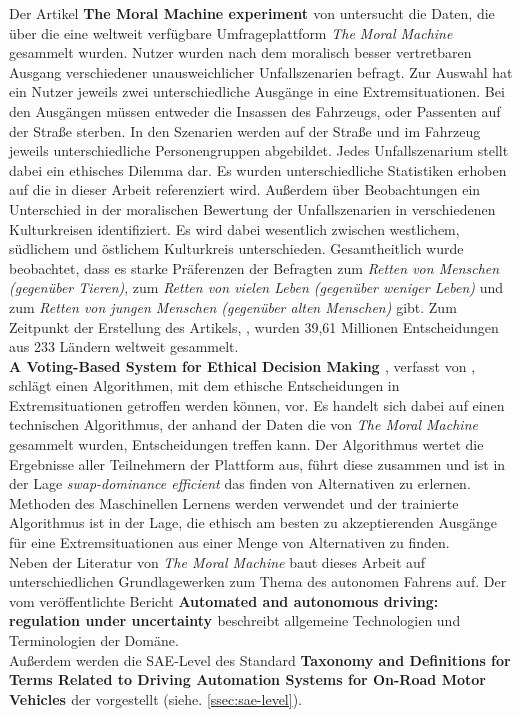 Der Artikel \textbf{The Moral Machine experiment \cite{moralMachine}} von \citeauthor{moralMachine} untersucht die Daten, die über die eine weltweit verfügbare Umfrageplattform \textit{The Moral Machine} gesammelt wurden. Nutzer wurden nach dem moralisch besser vertretbaren Ausgang verschiedener unausweichlicher Unfallszenarien befragt. Zur Auswahl hat ein Nutzer jeweils zwei unterschiedliche Ausgänge in eine Extremsituationen. Bei den Ausgängen müssen entweder die Insassen des Fahrzeugs, oder Passenten auf der Straße sterben. In den Szenarien werden auf der Straße und im Fahrzeug jeweils unterschiedliche Personengruppen abgebildet. Jedes Unfallszenarium stellt dabei ein ethisches Dilemma dar. Es wurden unterschiedliche Statistiken erhoben auf die in dieser Arbeit referenziert wird. Außerdem über Beobachtungen ein Unterschied in der moralischen Bewertung der Unfallszenarien in verschiedenen Kulturkreisen identifiziert. Es wird dabei wesentlich zwischen westlichem, südlichem und östlichem Kulturkreis unterschieden. Gesamtheitlich wurde beobachtet, dass es starke Präferenzen der Befragten zum \textit{Retten von Menschen (gegenüber Tieren)}, zum \textit{Retten von vielen Leben (gegenüber weniger Leben)} und zum \textit{Retten von jungen Menschen (gegenüber alten Menschen)} gibt. Zum Zeitpunkt der Erstellung des Artikels, \citeyear{moralMachine}, wurden 39,61 Millionen Entscheidungen aus 233 Ländern weltweit gesammelt. \\

\textbf{A Voting-Based System for Ethical Decision Making \cite{votingBasedSystem}}, verfasst von \citeauthor{votingBasedSystem}, schlägt einen Algorithmen, mit dem ethische Entscheidungen in Extremsituationen getroffen werden können, vor. Es handelt sich dabei auf einen technischen Algorithmus, der anhand der Daten die von \textit{The Moral Machine} gesammelt wurden, Entscheidungen treffen kann. Der Algorithmus wertet die Ergebnisse aller Teilnehmern der Plattform aus, führt diese zusammen und ist in der Lage  \textit{swap-dominance efficient} das finden von Alternativen zu erlernen. Methoden des Maschinellen Lernens werden verwendet und der trainierte Algorithmus ist in der Lage, die ethisch am besten zu akzeptierenden Ausgänge für eine Extremsituationen aus einer Menge von Alternativen zu finden.\\

Neben der Literatur von \textit{The Moral Machine} baut dieses Arbeit auf unterschiedlichen Grundlagewerken zum Thema des autonomen Fahrens auf. Der vom \citeauthor{smith2015automated} veröffentlichte Bericht \textbf{Automated and
autonomous driving: regulation under uncertainty \cite{smith2015automated}} beschreibt allgemeine Technologien und Terminologien der Domäne.\\

Außerdem werden die SAE-Level des Standard \textbf{Taxonomy and Definitions for Terms Related to Driving Automation Systems for On-Road Motor Vehicles \cite{standardSAE}} der \citeauthor{standardSAE} vorgestellt (siehe. \ref{ssec:sae-level}).\\